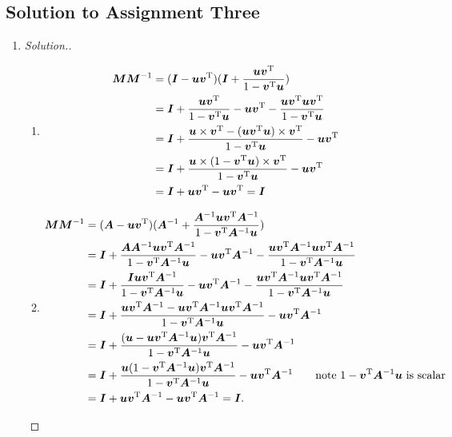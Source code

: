 \subsection{Solution to Assignment Three}
\begin{enumerate}
\item\begin{proof}[Solution.]
\begin{enumerate}
\item
\begin{equation}
\begin{split}
\bm M\bm M^{-1} &= (\bm I - \bm u\bm v^{\mathrm T})(\bm I + \frac{\bm u\bm v^{\mathrm T}}{1-\bm v^{\mathrm T}\bm u})\\ 
&= \bm I + \frac{\bm u\bm v^{\mathrm T}}{1-\bm v^{\mathrm T}\bm u} - \bm u\bm v^{\mathrm T} - \frac{\bm u\bm v^{\mathrm T}\bm u\bm v^{\mathrm T}}{1-\bm v^{\mathrm T}\bm u}\\ &=
\bm I + \frac{\bm u\times\bm v^{\mathrm T} - (\bm u\bm v^{\mathrm T}\bm u)\times\bm v^{\mathrm T}}{1-\bm v^{\mathrm T} \bm u} - \bm u\bm v^{\mathrm T} \\ &=\bm I + \frac{\bm u\times (1 - \bm v^{\mathrm T}\bm u)\times\bm v^{\mathrm T}}{1-\bm v^{\mathrm T} \bm u} - \bm u\bm v^{\mathrm T} \\&=\bm I + \bm u\bm v^{\mathrm T} - \bm u\bm v^{\mathrm T}= \bm I
\end{split}
\end{equation}
\item
\begin{equation}
\begin{split}
\bm M\bm M^{-1} &= (\bm A - \bm u\bm v\trans)(\bm A^{-1}+ \frac{\bm A^{-1}\bm u\bm v\trans\bm A^{-1}}{1-\bm v\trans\bm A^{-1}\bm u})\\
&=\bm I +\frac{\bm A\bm A^{-1}\bm u\bm v\trans\bm A^{-1}}{1-\bm v\trans\bm A^{-1}\bm u} - \bm u\bm v\trans\bm A^{-1} - \frac{\bm u\bm v\trans\bm A^{-1}\bm u\bm v\trans\bm A^{-1}}{1-\bm v\trans\bm A^{-1}\bm u}\\ &= \bm I + \frac{\bm I\bm u\bm v\trans\bm A^{-1}}{1 - \bm v\trans\bm A^{-1}\bm u} - \bm u\bm v\trans\bm A^{-1} - \frac{\bm u\bm v\trans\bm A^{-1}\bm u\bm v\trans\bm A^{-1}}{1-\bm v\trans\bm A^{-1}\bm u}\\ &= \bm I + \frac{\bm u\bm v\trans\bm A^{-1} - \bm u\bm v\trans\bm A^{-1}\bm u\bm v\trans\bm A^{-1}}{1-\bm v\trans\bm A^{-1}\bm u} - \bm u\bm v\trans\bm A^{-1} \\
&= \bm I + \frac{(\bm u - \bm u\bm v\trans\bm A^{-1}\bm u)\bm v\trans\bm A^{-1}}{1 - \bm v\trans\bm A^{-1}\bm u} - \bm u\bm v\trans\bm A^{-1}\\ 
&= \bm I + \frac{\bm u(1-\bm v\trans\bm A^{-1}\bm u)\bm v\trans\bm A^{-1}}{1- \bm v\trans\bm A^{-1}\bm u} - \bm u\bm v\trans\bm A^{-1}\qquad\text{note $1-\bm v\trans\bm A^{-1}\bm u$ is scalar}\\ &= \bm I + \bm u\bm v\trans\bm A^{-1} - \bm u\bm v\trans\bm A^{-1}= \bm I.

\end{split}
\end{equation}
\end{enumerate}
\end{proof}
\end{enumerate}

